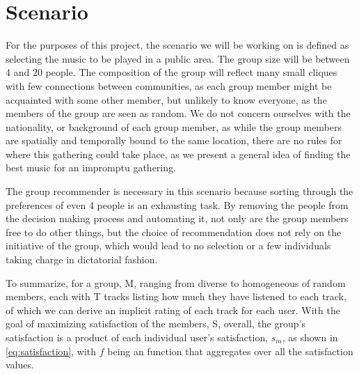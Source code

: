 \section{Scenario}

For the purposes of this project, the scenario we will be working on is defined as selecting the music to be played in a public area. The group size will be between 4 and 20 people. The composition of the group will reflect many small cliques with few connections between communities, as each group member might be acquainted with some other member, but unlikely to know everyone, as the members of the group are seen as random. We do not concern ourselves with the nationality, or background of each group member, as while the group members are spatially and temporally bound to the same location, there are no rules for where this gathering could take place, as we present a general idea of finding the best music for an impromptu gathering.

The group recommender is necessary in this scenario because sorting through the preferences of even 4 people is an exhausting task. By removing the people from the decision making process and automating it, not only are the group members free to do other things, but the choice of recommendation does not rely on the initiative of the group, which would lead to no selection or a few individuals taking charge in dictatorial fashion.

To summarize, for a group, M, ranging from diverse to homogeneous of random members, each with T tracks listing how much they have listened to each track, of which we can derive an implicit rating of each track for each user. With the goal of maximizing satisfaction of the members, S, overall, the group's satisfaction is a product of each individual user's satisfaction, $s_m$, as shown in \ref{eq:satisfaction}, with $f$ being an function that aggregates over all the satisfaction values.

